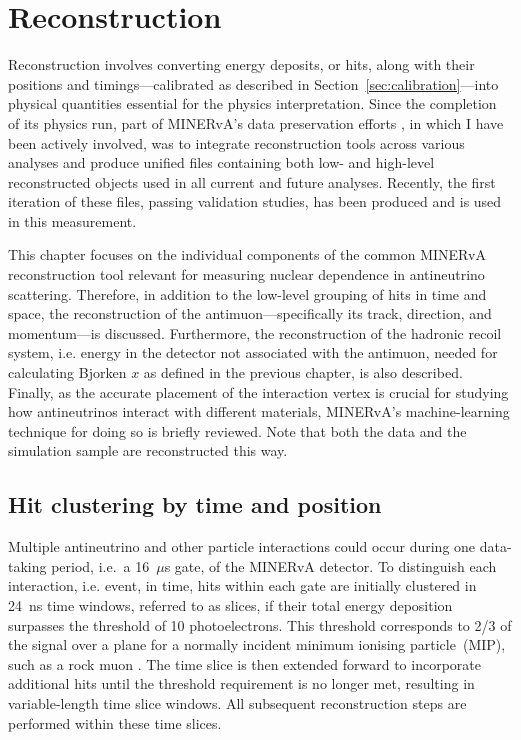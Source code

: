 \chapter{Reconstruction}

\label{ch:Reconstruction}

Reconstruction involves converting energy deposits, or hits, along with their positions and timings—calibrated as described in Section~\ref{sec:calibration}—into physical quantities essential for the physics interpretation. Since the completion of its physics run, part of MINERvA's data preservation efforts \cite{dataPreservation_fine2020}, in which I have been actively involved, was to integrate reconstruction tools across various analyses and produce unified files containing both low- and high-level reconstructed objects used in all current and future analyses. Recently, the first iteration of these files, passing validation studies, has been produced and is used in this measurement.

This chapter focuses on the individual components of the common MINERvA reconstruction tool relevant for measuring nuclear dependence in antineutrino scattering. Therefore, in addition to the low-level grouping of hits in time and space, the reconstruction of the antimuon---specifically its track, direction, and momentum---is discussed. Furthermore, the reconstruction of the hadronic recoil system, i.e. energy in the detector not associated with the antimuon, needed for calculating Bjorken $x$ as defined in the previous chapter, is also described. Finally, as the accurate placement of the interaction vertex is crucial for studying how antineutrinos interact with different materials, MINERvA's machine-learning technique for doing so is briefly reviewed. Note that both the data and the simulation sample are reconstructed this way.


\section{Hit clustering by time and position}

Multiple antineutrino and other particle interactions could occur during one data-taking period, i.e.~a 16~$\mu$s gate, of the MINERvA detector. To distinguish each interaction, i.e. event, in time, hits within each gate are initially clustered in 24~ns time windows, referred to as slices, if their total energy deposition surpasses the threshold of 10 photoelectrons. This threshold corresponds to 2/3 of the signal over a plane for a normally incident minimum ionising particle~(MIP), such as a rock muon \cite{Aliaga_2014}. The time slice is then extended forward to incorporate additional hits until the threshold requirement is no longer met, resulting in variable-length time slice windows. All subsequent reconstruction steps are performed within these time slices.

